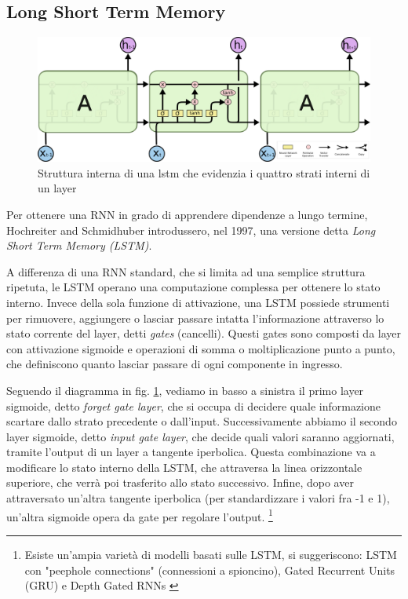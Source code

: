 \subsection{Long Short Term Memory}
\label{sub:lstm}
\begin{figure}[ht]
	\centering
	\includegraphics{img/lstm_struct.png}
	\caption{Struttura interna di una lstm che evidenzia i quattro strati interni di un layer}
	\label{fig:1.9}
\end{figure}
Per ottenere una RNN in grado di apprendere dipendenze a lungo termine, Hochreiter and Schmidhuber \cite{vanishing} introdussero, nel 1997, una versione detta \textit{Long Short Term Memory (LSTM)}.

A differenza di una RNN standard, che si limita ad una semplice struttura ripetuta, le LSTM operano una computazione complessa per ottenere lo stato interno. Invece della sola funzione di attivazione, una LSTM possiede strumenti per rimuovere, aggiungere o lasciar passare intatta l'informazione attraverso lo stato corrente del layer, detti \textit{gates} (cancelli). Questi gates sono composti da layer con attivazione sigmoide e operazioni di somma o moltiplicazione punto a punto, che definiscono quanto lasciar passare di ogni componente in ingresso.

Seguendo il diagramma in fig. \ref{fig:1.9}, vediamo in basso a sinistra il primo layer sigmoide, detto \textit{forget gate layer}, che si occupa di decidere quale informazione scartare dallo strato precedente o dall'input. Successivamente abbiamo il secondo layer sigmoide, detto \textit{input gate layer}, che decide quali valori saranno aggiornati, tramite l'output di un layer a tangente iperbolica. Questa combinazione va a modificare lo stato interno della LSTM, che attraversa la linea orizzontale superiore, che verrà poi trasferito allo stato successivo. Infine, dopo aver attraversato un'altra tangente iperbolica (per standardizzare i valori fra -1 e 1), un'altra sigmoide opera da gate per regolare l'output. \footnote{Esiste un'ampia varietà di modelli basati sulle LSTM, si suggeriscono: LSTM con "peephole connections" \cite{peephole} (connessioni a spioncino), Gated Recurrent Units (GRU) \cite{GRU} e Depth Gated RNNs \cite{DGRNN}}

